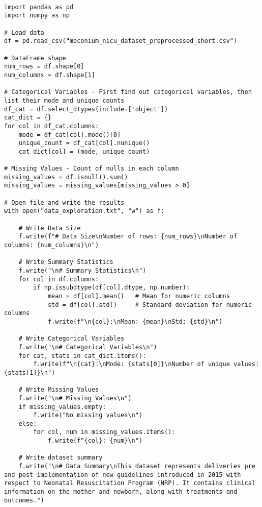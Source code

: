 \documentclass[11pt]{article}
\begin{document}
\begin{verbatim}

import pandas as pd
import numpy as np

# Load data
df = pd.read_csv("meconium_nicu_dataset_preprocessed_short.csv")

# DataFrame shape
num_rows = df.shape[0]
num_columns = df.shape[1]

# Categorical Variables - First find out categorical variables, then list their mode and unique counts
df_cat = df.select_dtypes(include=['object'])
cat_dict = {}
for col in df_cat.columns:
    mode = df_cat[col].mode()[0]
    unique_count = df_cat[col].nunique()
    cat_dict[col] = (mode, unique_count)

# Missing Values - Count of nulls in each column
missing_values = df.isnull().sum()
missing_values = missing_values[missing_values > 0]

# Open file and write the results
with open("data_exploration.txt", "w") as f:
    
    # Write Data Size
    f.write(f"# Data Size\nNumber of rows: {num_rows}\nNumber of columns: {num_columns}\n")
    
    # Write Summary Statistics
    f.write("\n# Summary Statistics\n")
    for col in df.columns:
        if np.issubdtype(df[col].dtype, np.number):
            mean = df[col].mean()   # Mean for numeric columns
            std = df[col].std()     # Standard deviation for numeric columns
            f.write(f"\n{col}:\nMean: {mean}\nStd: {std}\n")
        
    # Write Categorical Variables
    f.write("\n# Categorical Variables\n")
    for cat, stats in cat_dict.items():
        f.write(f"\n{cat}:\nMode: {stats[0]}\nNumber of unique values: {stats[1]}\n")

    # Write Missing Values
    f.write("\n# Missing Values\n")
    if missing_values.empty:
        f.write("No missing values\n")
    else:
        for col, num in missing_values.items():
            f.write(f"{col}: {num}\n")
        
    # Write dataset summary
    f.write("\n# Data Summary\nThis dataset represents deliveries pre and post implementation of new guidelines introduced in 2015 with respect to Neonatal Resuscitation Program (NRP). It contains clinical information on the mother and newborn, along with treatments and outcomes.")


\end{verbatim}
\end{document}
